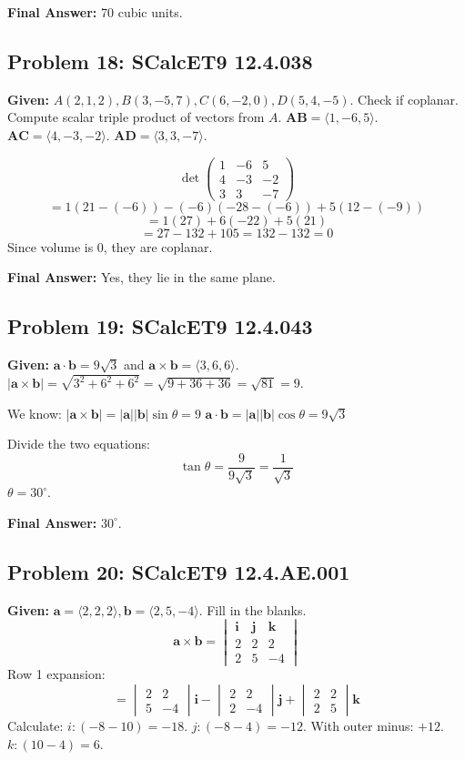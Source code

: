 \documentclass[11pt]{article}
\renewcommand{\vec}[1]{\mathbf{#1}}
\newcommand{\ihat}{\mathbf{i}}
\newcommand{\jhat}{\mathbf{j}}
\newcommand{\khat}{\mathbf{k}}
\begin{document}
\textbf{Final Answer:} 70 cubic units.

\hrulefill

\subsection*{Problem 18: SCalcET9 12.4.038}
\textbf{Given:} $A(2, 1, 2), B(3, -5, 7), C(6, -2, 0), D(5, 4, -5)$.
Check if coplanar. Compute scalar triple product of vectors from $A$.
$\vec{AB} = \langle 1, -6, 5 \rangle$.
$\vec{AC} = \langle 4, -3, -2 \rangle$.
$\vec{AD} = \langle 3, 3, -7 \rangle$.

\[
\det \begin{pmatrix} 1 & -6 & 5 \\ 4 & -3 & -2 \\ 3 & 3 & -7 \end{pmatrix}
\]
\[
= 1(21 - (-6)) - (-6)(-28 - (-6)) + 5(12 - (-9))
\]
\[
= 1(27) + 6(-22) + 5(21)
\]
\[
= 27 - 132 + 105 = 132 - 132 = 0
\]
Since volume is 0, they are coplanar.

\textbf{Final Answer:} Yes, they lie in the same plane.

\hrulefill

\subsection*{Problem 19: SCalcET9 12.4.043}
\textbf{Given:} $\vec{a} \cdot \vec{b} = 9\sqrt{3}$ and $\vec{a} \times \vec{b} = \langle 3, 6, 6 \rangle$.
$|\vec{a} \times \vec{b}| = \sqrt{3^2 + 6^2 + 6^2} = \sqrt{9 + 36 + 36} = \sqrt{81} = 9$.

We know:
$|\vec{a} \times \vec{b}| = |\vec{a}||\vec{b}| \sin \theta = 9$
$\vec{a} \cdot \vec{b} = |\vec{a}||\vec{b}| \cos \theta = 9\sqrt{3}$

Divide the two equations:
\[
\tan \theta = \frac{9}{9\sqrt{3}} = \frac{1}{\sqrt{3}}
\]
$\theta = 30^\circ$.

\textbf{Final Answer:} $30^\circ$.

\hrulefill

\subsection*{Problem 20: SCalcET9 12.4.AE.001}
\textbf{Given:} $\vec{a} = \langle 2, 2, 2 \rangle, \vec{b} = \langle 2, 5, -4 \rangle$.
Fill in the blanks.
\[
\vec{a} \times \vec{b} = \begin{vmatrix} \ihat & \jhat & \khat \\ 2 & 2 & 2 \\ 2 & 5 & -4 \end{vmatrix}
\]
Row 1 expansion:
\[
= \begin{vmatrix} 2 & 2 \\ 5 & -4 \end{vmatrix}\ihat - \begin{vmatrix} 2 & 2 \\ 2 & -4 \end{vmatrix}\jhat + \begin{vmatrix} 2 & 2 \\ 2 & 5 \end{vmatrix}\khat
\]
Calculate:
$i: (-8 - 10) = -18$.
$j: (-8 - 4) = -12$. With outer minus: $+12$.
$k: (10 - 4) = 6$.
\end{document}
